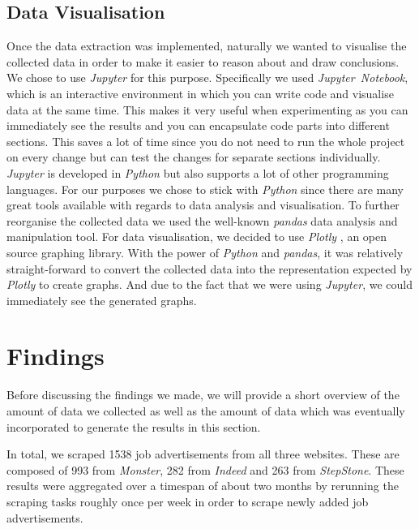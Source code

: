 \documentclass[runningheads]{llncs}
\begin{document}
\subsection{Data Visualisation}
\label{sub:data_visualisation}

Once the data extraction was implemented, naturally we wanted to visualise the collected data in order to make it easier to reason about and draw conclusions. We chose to use \textit{Jupyter} \cite{jupyter} for this purpose. Specifically we used \textit{Jupyter~Notebook}, which is an interactive environment in which you can write code and visualise data at the same time. This makes it very useful when experimenting as you can immediately see the results and you can encapsulate code parts into different sections. This saves a lot of time since you do not need to run the whole project on every change but can test the changes for separate sections individually. \textit{Jupyter} is developed in \textit{Python} \cite{python} but also supports a lot of other programming languages. For our purposes we chose to stick with \textit{Python} since there are many great tools available with regards to data analysis and visualisation. To further reorganise the collected data we used the well-known \textit{pandas} \cite{pandas} data analysis and manipulation tool. For data visualisation, we decided to use \textit{Plotly} \cite{plotly}, an open source graphing library. With the power of \textit{Python} and \textit{pandas}, it was relatively straight-forward to convert the collected data into the representation expected by \textit{Plotly} to create graphs. And due to the fact that we were using \textit{Jupyter}, we could immediately see the generated graphs.

\section{Findings}
\label{sec:findings}

Before discussing the findings we made, we will provide a short overview of the amount of data we collected as well as the amount of data which was eventually incorporated to generate the results in this section.


In total, we scraped 1538 job advertisements from all three websites. These are composed of 993 from \textit{Monster}, 282 from \textit{Indeed} and 263 from \textit{StepStone}. These results were aggregated over a timespan of about two months by rerunning the scraping tasks roughly once per week in order to scrape newly added job advertisements.
\end{document}
